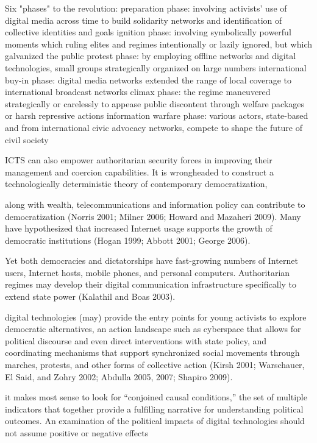 Six "phases" to the revolution:
	preparation phase: involving activists’ use of digital media across time to build solidarity networks and identification of collective identities and goals
	ignition phase: involving symbolically powerful moments which ruling elites and regimes intentionally or lazily ignored, but which galvanized the public
	protest phase: by employing offline networks and digital technologies, small groups strategically organized on large numbers
	international buy-in phase: digital media networks extended the range of local coverage to international broadcast networks
	climax phase:  the regime maneuvered strategically or carelessly to appease public discontent through welfare packages or harsh repressive actions
	information warfare phase: various actors, state-based and from international civic advocacy networks, compete to shape the future of civil society

ICTS can also empower authoritarian security forces in improving their management and coercion capabilities.  It is wrongheaded
to construct a technologically deterministic theory of contemporary
democratization,


along with wealth, telecommunications and information policy can contribute to democratization (Norris 2001; Milner 2006; Howard and Mazaheri 2009). Many have hypothesized that increased Internet usage supports the growth of democratic institutions (Hogan 1999; Abbott 2001; George 2006).

Yet both democracies and dictatorships have fast-growing numbers of Internet
users, Internet hosts, mobile phones, and personal computers. Authoritarian
regimes may develop their digital communication infrastructure specifically to
extend state power (Kalathil and Boas 2003).

digital technologies (may) provide the entry points for young activists to explore democratic alternatives, an action landscape such as cyberspace that allows for political discourse and even direct interventions with state policy, and coordinating mechanisms that support synchronized social movements through marches, protests, and other forms of collective action (Kirsh 2001; Warschauer, El Said, and Zohry 2002; Abdulla 2005, 2007; Shapiro 2009).

it makes most sense to look for “conjoined causal conditions,” the set of multiple indicators that together provide a fulfilling narrative for understanding political outcomes. An examination of the political impacts of digital technologies should not assume positive or negative effects

